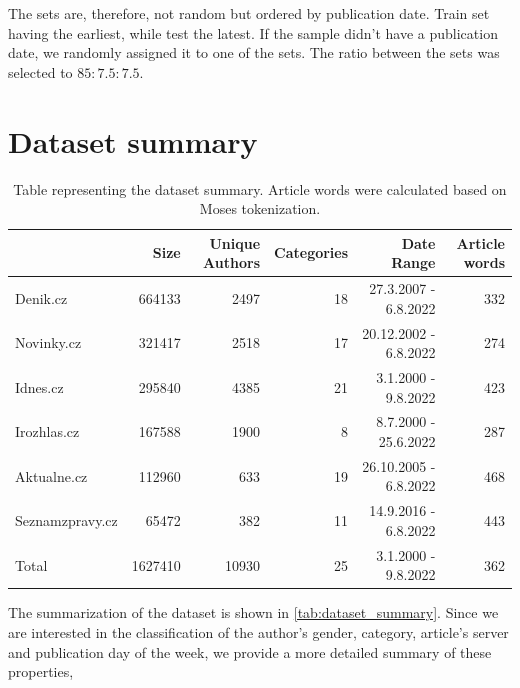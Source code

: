 The sets are, therefore, not random but ordered by publication date. Train set having the earliest, while test the latest.
If the sample didn't have a publication date, we randomly assigned it to one of the sets.
The ratio between the sets was selected to $85:7.5:7.5$.
\section{Dataset summary}
\begin{table}[h]
    \centering\footnotesize\sf
    \begin{tabular}{lrrrrr}
        \toprule
        {}              & Size    & Unique Authors & Categories & Date Range            & Article words \\
        \midrule
        Denik.cz        & 664133  & 2497           & 18         & 27.3.2007 - 6.8.2022  & 332           \\
        Novinky.cz      & 321417  & 2518           & 17         & 20.12.2002 - 6.8.2022 & 274           \\
        Idnes.cz        & 295840  & 4385           & 21         & 3.1.2000 - 9.8.2022   & 423           \\
        Irozhlas.cz     & 167588  & 1900           & 8          & 8.7.2000 - 25.6.2022  & 287           \\
        Aktualne.cz     & 112960  & 633            & 19         & 26.10.2005 - 6.8.2022 & 468           \\
        Seznamzpravy.cz & 65472   & 382            & 11         & 14.9.2016 - 6.8.2022  & 443           \\
        \midrule
        Total           & 1627410 & 10930          & 25         & 3.1.2000 - 9.8.2022   & 362           \\
        \bottomrule
    \end{tabular}
    \caption{Table representing the dataset summary. Article words were calculated based on Moses tokenization.}
    \label{tab:dataset_summary}
\end{table}
The summarization of the dataset is shown in \autoref{tab:dataset_summary}.
Since we are interested in the classification of the author's gender, category,
article's server and publication day of the week, we provide a more detailed summary of these properties,

